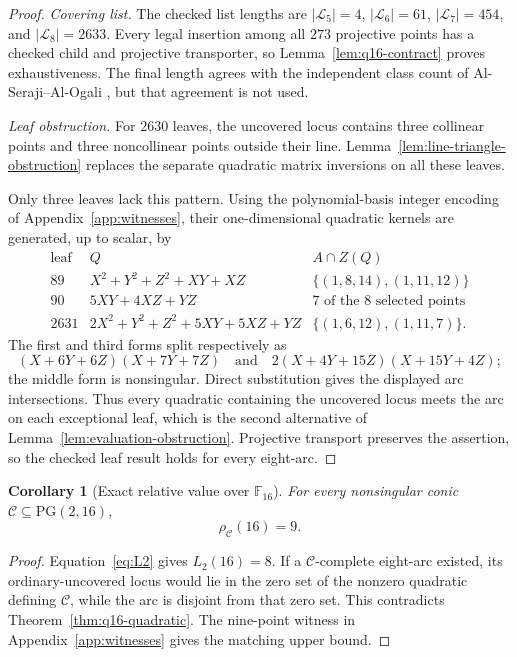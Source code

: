 \documentclass[11pt]{article}
\newtheorem{corollary}[theorem]{Corollary}
\theoremstyle{definition}
\theoremstyle{remark}
\newcommand{\PG}{\mathrm{PG}}
\newcommand{\F}{\mathbb{F}}
\newcommand{\cC}{\mathcal{C}}
\newcommand{\rhoC}{\rho_{\cC}}
\begin{document}
\begin{proof}
\emph{Covering list.}
The checked list lengths are
$|\mathcal L_5|=4$, $|\mathcal L_6|=61$, $|\mathcal L_7|=454$, and
$|\mathcal L_8|=2633$.  Every legal insertion among all \(273\) projective
points has a checked child and projective transporter, so
Lemma~\ref{lem:q16-contract} proves exhaustiveness.  The final length agrees
with the independent class count of Al-Seraji--Al-Ogali
\cite[Theorem~3.8.1]{AlSerajiAlOgali2018}, but that agreement is not used.

\emph{Leaf obstruction.}
For \(2630\) leaves, the uncovered locus contains three collinear points
and three noncollinear points outside their line.
Lemma~\ref{lem:line-triangle-obstruction} replaces the separate quadratic
matrix inversions on all these leaves.

Only three leaves lack this pattern.  Using the polynomial-basis integer
encoding of Appendix~\ref{app:witnesses}, their one-dimensional quadratic
kernels are generated, up to scalar, by
\[
\begin{array}{c|c|c}
\text{leaf}&Q& A\cap Z(Q)\\ \hline
89&
X^2+Y^2+Z^2+XY+XZ&
\{(1,8,14),(1,11,12)\}\\
90&
5XY+4XZ+YZ&
7\text{ of the }8\text{ selected points}\\
2631&
2X^2+Y^2+Z^2+5XY+5XZ+YZ&
\{(1,6,12),(1,11,7)\}.
\end{array}
\]
The first and third forms split respectively as
\[
 (X+6Y+6Z)(X+7Y+7Z)
\quad\text{and}\quad
 2(X+4Y+15Z)(X+15Y+4Z);
\]
the middle form is nonsingular.  Direct substitution gives the displayed
arc intersections.  Thus every quadratic containing the uncovered locus
meets the arc on each exceptional leaf, which is the second alternative of
Lemma~\ref{lem:evaluation-obstruction}.
Projective transport preserves the assertion, so the checked leaf result
holds for every eight-arc.
\end{proof}

\begin{corollary}[Exact relative value over $\F_{16}$]
\label{cor:q16-exact}
For every nonsingular conic $\cC\subseteq\PG(2,16)$,
\[
 \rhoC(16)=9.
\]
\end{corollary}

\begin{proof}
Equation~\eqref{eq:L2} gives $L_2(16)=8$.  If a $\cC$-complete eight-arc
existed, its ordinary-uncovered locus would lie in the zero set of the
nonzero quadratic defining $\cC$, while the arc is disjoint from that zero
set.  This contradicts Theorem~\ref{thm:q16-quadratic}.  The nine-point
witness in Appendix~\ref{app:witnesses} gives the matching upper bound.
\end{proof}
\end{document}
